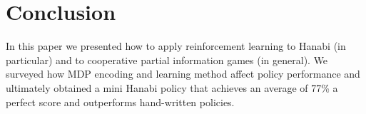 \section{Conclusion}\label{sec:conclusion}
In this paper we presented how to apply reinforcement learning to Hanabi (in
particular) and to cooperative partial information games (in general). We
surveyed how MDP encoding and learning method affect policy performance and
ultimately obtained a mini Hanabi policy that achieves an average of 77\% a
perfect score and outperforms hand-written policies.
